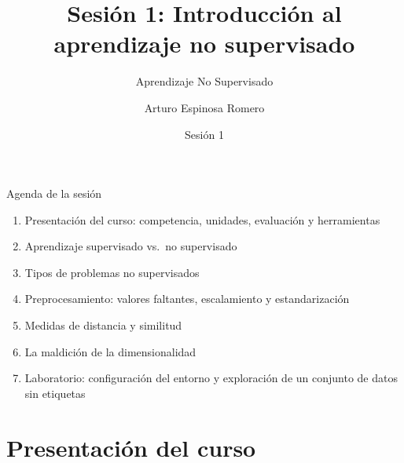 \documentclass[aspectratio=169,11pt]{beamer}
\title[Sesión 1: Introducción]{Sesión 1: Introducción al aprendizaje no supervisado}
\subtitle{Aprendizaje No Supervisado}
\author[A. Espinosa Romero]{Arturo Espinosa Romero}
\institute[FMAT]{Maestría en Inteligencia Artificial \\ Facultad de Matemáticas}
\date{Sesión 1}
\begin{document}
\begin{frame}
  \titlepage
\end{frame}

\begin{frame}{Agenda de la sesión}
  \begin{enumerate}
    \item Presentación del curso: competencia, unidades, evaluación y herramientas
    \item Aprendizaje supervisado vs.\ no supervisado
    \item Tipos de problemas no supervisados
    \item Preprocesamiento: valores faltantes, escalamiento y estandarización
    \item Medidas de distancia y similitud
    \item La maldición de la dimensionalidad
    \item Laboratorio: configuración del entorno y exploración de un conjunto de datos sin etiquetas
  \end{enumerate}
\end{frame}

\section{Presentación del curso}
\end{document}
